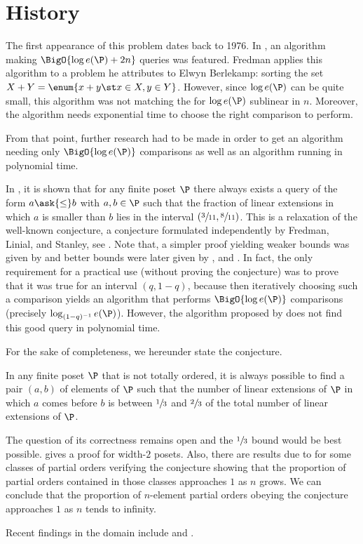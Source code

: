 \section{History}

The first appearance of this problem dates back to 1976. In
\citet*{fredman:1976}, an algorithm making $\BigO{\log e(\P) + 2n}$ queries was
featured. Fredman applies this algorithm to a problem he attributes to Elwyn
Berlekamp: sorting the set $X + Y = \enum{x + y \st x \in X, y \in Y}$.
However,
since \(\log e(\P)\) can be quite small, this algorithm was not matching the \ITLB
for $\log e(\P)$ sublinear in \(n\). Moreover, the algorithm needs exponential time to
choose the right comparison to perform.

From that point, further research had to be made in order to get an algorithm
needing only $\BigO{\log e(\P)}$ comparisons as well as an algorithm running in
polynomial time.

In \citet*{kahn1984balancing}, it is shown that for any finite poset \(\P\)
there always exists a query of the form \(a \ask{\leq} b\) with \(a,b \in \P\)
such that the fraction of linear extensions in which $a$ is smaller than $b$
lies in the interval $(\sfrac{3}{11}, \sfrac{8}{11})$. This is a relaxation of
the well-known \onethirdtwothird conjecture, a conjecture formulated
independently by Fredman, Linial, and Stanley, see
\citet*{linial:1984}. Note that, a simpler proof yielding weaker
bounds was given by \citet*{kahn1991balancing} and better bounds were later
given by \citet*{brightwell1995balancing}, and \citet*{brightwell1999balanced}.
In fact, the only requirement for a practical use (without proving the
conjecture) was to prove that it was true for an interval $(q, 1-q)$, because
then iteratively choosing such a comparison yields an algorithm that performs
$\BigO{\log e(\P)}$ comparisons (precisely $\log_{(1-q)^{-1}} e(\P)$). However, the
algorithm proposed by \citet*{kahn1984balancing} does not find this
good query in polynomial time.

For the sake of completeness, we hereunder state the \onethirdtwothird
conjecture.
\begin{conjecture}
In any finite poset $\P$ that is not totally ordered, it is always possible to
find a pair $(a,b)$ of elements of $\P$ such that the number of linear
extensions of $\P$ in which $a$ comes before $b$ is between $\sfrac{1}{3}$ and
$\sfrac{2}{3}$ of the total number of linear extensions of $\P$.
\end{conjecture}

The question of its correctness remains open and the
$\sfrac{1}{3}$ bound would be best possible. \citet*{linial:1984} gives a proof
for width-\(2\) posets. Also, there are results due to
\citet*{peczarski:2006} for some classes of partial orders verifying the
conjecture showing that the proportion of partial orders contained in those
classes approaches $1$ as $n$ grows. We can conclude that the proportion of
$n$-element partial orders obeying the \onethirdtwothird conjecture approaches
$1$ as \(n\) tends to infinity.

Recent findings in the domain include \citet*{zaguia:2011} and
\citet*{peczarski:2008}.

